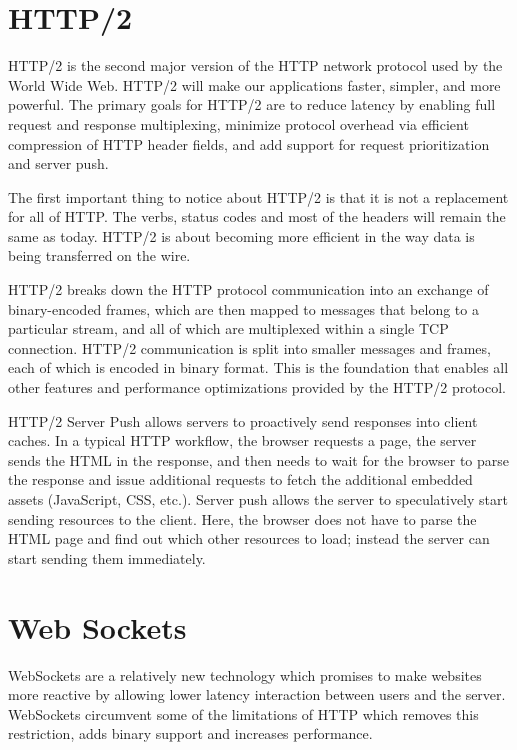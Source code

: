 \section{HTTP/2}
\label{section:http2}
HTTP/2 is the second major version of the HTTP network protocol used by the World Wide Web. HTTP/2 will make our applications faster, simpler, and more powerful. The primary goals for HTTP/2 are to reduce latency by enabling full request and response multiplexing, minimize protocol overhead via efficient compression of HTTP header fields, and add support for request prioritization and server push\citep{thesis:state10}.

The first important thing to notice about HTTP/2 is that it is not a replacement for all of HTTP. The verbs, status codes and most of the headers will remain the same as today. HTTP/2 is about becoming more efficient in the way data is being transferred on the wire\citep{thesis:state11}.

HTTP/2 breaks down the HTTP protocol communication into an exchange of binary-encoded frames, which are then mapped to messages that belong to a particular stream, and all of which are multiplexed within a single TCP connection. HTTP/2 communication is split into smaller messages and frames, each of which is encoded in binary format. This is the foundation that enables all other features and performance optimizations provided by the HTTP/2 protocol.

HTTP/2 Server Push allows servers to proactively send responses into client caches. In a typical HTTP workflow, the browser requests a page, the server sends the HTML in the response, and then needs to wait for the browser to parse the response and issue additional requests to fetch the additional embedded assets (JavaScript, CSS, etc.). Server push allows the server to speculatively start sending resources to the client. Here, the browser does not have to parse the HTML page and find out which other resources to load; instead the server can start sending them immediately.
\section{Web Sockets}
\label{section:websockets}

WebSockets\citep{Ontology:matching} are a relatively new technology which promises to make websites more reactive by allowing lower latency interaction between users and the server. WebSockets circumvent some of the limitations of HTTP which removes this restriction, adds binary support and increases performance.

